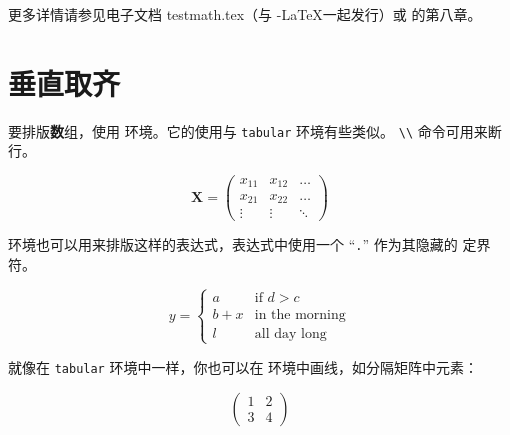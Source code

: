 
更多详情请参见电子文档 testmath.tex（与 \AmS-\LaTeX 一起发行）或 \companion{} 的第八章。
\section{垂直取齐}
\label{sec:vert}


要排版{\textbf
数组}，使用  环境。它的使用与 \texttt{tabular} 环境有些类似。 \verb|\\| 命令可用来断行。


\begin{example}
\begin{displaymath}
\mathbf{X} =
\left( \begin{array}{ccc}
x_{11} & x_{12} & \ldots \\
x_{21} & x_{22} & \ldots \\
\vdots & \vdots & \ddots
\end{array} \right)
\end{displaymath}
\end{example}

 环境也可以用来排版这样的表达式，表达式中使用一个 ``\verb|.|'' 作为其隐藏的  定界符。

\begin{example}
\begin{displaymath}
y = \left\{ \begin{array}{ll}
 a & \textrm{if $d>c$}\\
 b+x & \textrm{in the morning}\\
 l & \textrm{all day long}
  \end{array} \right.
\end{displaymath}
\end{example}

就像在 \verb|tabular| 环境中一样，你也可以在  环境中画线，如分隔矩阵中元素：
\begin{example}
\begin{displaymath}
\left(\begin{array}{c|c}
 1 & 2 \\
\hline
3 & 4
\end{array}\right)
\end{displaymath}
\end{example}




